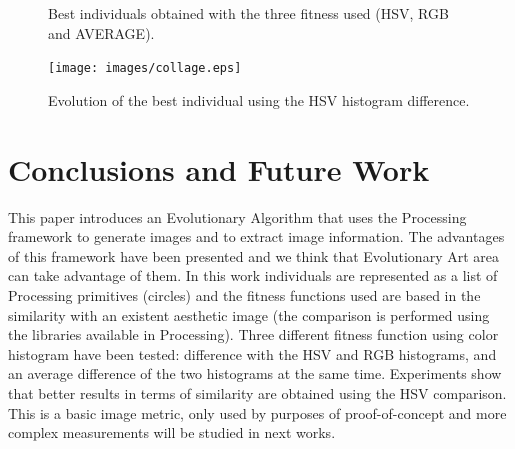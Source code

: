 \documentclass[conference]{IEEEtran}
\begin{document}
\begin{figure}[ht]
{ }
\caption{Best individuals obtained with the three fitness used (HSV, RGB and AVERAGE).}
\label{fig:bestinds}
\end{figure}

\begin{figure}
   \texttt{[image: images/collage.eps]}
\caption{Evolution of the best individual using the HSV histogram difference. }
\label{fig:collage}
\end{figure}

\section{Conclusions and Future Work}
\label{sec:conclusions}
This paper introduces an Evolutionary Algorithm that uses the Processing framework to generate images and to extract image information. The advantages of this framework have been presented and we think that Evolutionary Art area can take advantage of them. In this work individuals are represented as a list of Processing primitives (circles) and the fitness functions used are based in the similarity with an existent aesthetic image (the comparison is performed using the libraries available in Processing). Three different fitness function using color histogram have been tested: difference with the HSV and RGB histograms, and an average difference of the two histograms at the same time. Experiments show that better results in terms of similarity are obtained using the HSV comparison. This is a basic image metric, only used by purposes of proof-of-concept and more complex measurements will be studied in next works.
\end{document}
